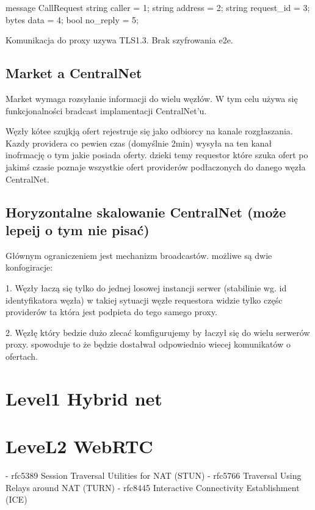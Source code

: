 \documentclass[12pt]{article}
\begin{document}
 \begin{code}
    message CallRequest {
        string caller = 1;
        string address = 2;
        string request_id = 3;
        bytes data = 4;
        bool no_reply = 5;
      }
 \end{code}


Komunikacja do proxy uzywa TLS1.3. Brak szyfrowania e2e.


\subsection{Market a CentralNet}

Market wymaga rozsyłanie informacji do wielu węzłów.
W tym celu używa się funkcjonalności bradcast implamentacji CentralNet'u.

Węzły kótee szujkją ofert rejestruje się jako odbiorcy na kanale rozgłaszania.
Kazdy providera co pewien czas (domyślnie 2min) wysyła na ten kanał inofrmację 
o tym jakie posiada oferty. dzieki temy requestor które szuka ofert po jakimś czasie poznaje 
wszystkie ofert providerów podłaczonych do danego węzła CentralNet.


\subsection{Horyzontalne skalowanie CentralNet (może lepeij o tym nie pisać)}

Głównym ograniczeniem jest mechanizm broadcastów. możliwe są dwie konfogiracje:

1. Węzły łaczą się tylko do jednej losowej instancji serwer (stabilinie wg. id identyfikatora węzła) 
w takiej sytuacji węzłe requestora widzie tylko częśc providerów ta która jest podpieta do tego samego proxy.

2. Węzłę który bedzie dużo zlecać komfigurujemy by łaczył się do wielu serwerów proxy. spowoduje to że będzie dostałwał 
odpowiednio wiecej komunikatów o ofertach.


\section{Level1 Hybrid net}



\section{LeveL2 WebRTC}

- rfc5389 Session Traversal Utilities for NAT (STUN) 
- rfc5766 Traversal Using Relays around NAT (TURN)
- rfc8445 Interactive Connectivity Establishment (ICE)
\end{document}
